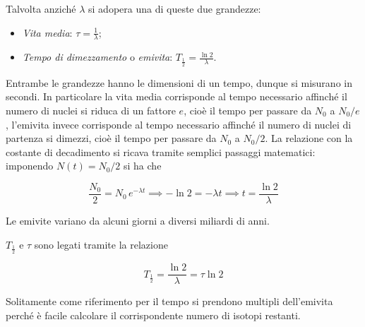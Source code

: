 Talvolta anziché $\lambda$ si adopera una di queste due grandezze:

\begin{itemize}
    \item \textit{Vita media}: $\displaystyle \tau=\frac{1}{\lambda}$;
    \item \textit{Tempo di dimezzamento} o \textit{emivita}: $\displaystyle T_{\frac{1}{2}}=\frac{\ln{2}}{\lambda}$.
\end{itemize}

Entrambe le grandezze hanno le dimensioni di un tempo, dunque si misurano in secondi. In particolare la vita media corrisponde al tempo necessario affinché il numero di nuclei si riduca di un fattore $e$, cioè il tempo per passare da $N_0$ a $N_0/e$, l'emivita invece corrisponde al tempo necessario affinché il numero di nuclei di partenza si dimezzi, cioè il tempo per passare da $N_0$ a $N_0/2$. La relazione con la costante di decadimento si ricava tramite semplici passaggi matematici: imponendo $N(t)=N_0/2$ si ha che

\begin{equation*}
    \frac{N_0}{2}=N_0\,e^{-\lambda t}
    \implies
    -\ln{2}=-\lambda t
    \implies
    t=\frac{\ln{2}}{\lambda}
\end{equation*}

Le emivite variano da alcuni giorni a diversi miliardi di anni.

$T_{\frac{1}{2}}$ e $\tau$ sono legati tramite la relazione

\begin{equation*}
    T_{\frac{1}{2}}=\frac{\ln{2}}{\lambda}=\tau \ln{2}
\end{equation*}

Solitamente come riferimento per il tempo si prendono multipli dell'emivita perché è facile calcolare il corrispondente numero di isotopi restanti.

\begin{figure}[H]
    \centering
  \end{figure}

